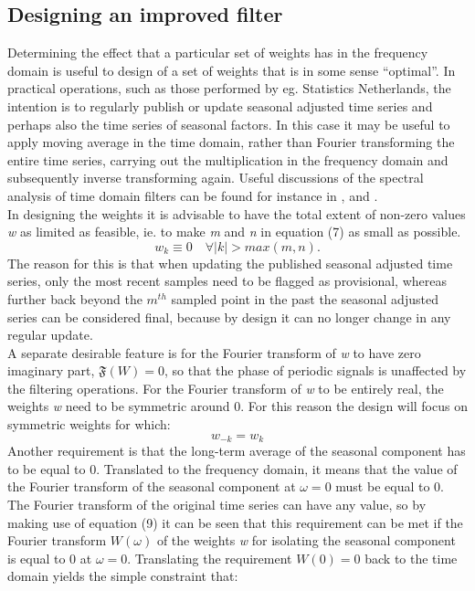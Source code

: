 \documentclass[english,blauw]{cbsdiscussionpaper}
\begin{document}
\subsection{ Designing an improved filter}
Determining the effect that a particular set of weights has in the frequency domain is useful to design of a set of weights that is in some sense ``optimal''. In practical operations, such as those performed by eg. Statistics Netherlands, the intention is to regularly publish or update seasonal adjusted time series and perhaps also the time series of seasonal factors. In this case it may be useful to apply moving average in the time domain, rather than Fourier transforming the entire time series, carrying out the multiplication in the frequency domain and subsequently inverse transforming again. Useful discussions of the spectral analysis of time domain filters can be found for instance in \citep{gre1970},\citep{shueal2011} and \citep{fineal2006}.\\In designing the weights it is advisable  to have the total extent of non-zero values \textit{w} as limited as feasible, ie. to make \textit{m} and \textit{n} in equation (7) as small as possible.
\begin{equation}
w_k \equiv 0 \quad \forall |k| > max(m,n).
\end{equation}
The reason for this is that when updating the published seasonal adjusted time series, only the most recent samples need to be flagged as provisional, whereas further back beyond the $m^{th}$ sampled point in the past the seasonal adjusted series can be considered final, because by design it can no longer change in any regular update.\\A separate desirable feature is for the Fourier transform of \textit{w} to have zero imaginary part, $\mathfrak{F}(W) = 0$, so that the phase of periodic signals is unaffected by the filtering operations. For the Fourier transform of \textit{w} to be entirely real, the weights \textit{w} need to be symmetric around 0. For this reason the design will focus on symmetric weights for which:
\begin{equation}
w_{-k} = w_k
\end{equation}
Another requirement is that the long-term average of the seasonal component has to be equal to 0. Translated to the frequency domain, it means that the value of the Fourier transform of the seasonal component at $\omega=0$ must be equal to 0. The Fourier transform of the original time series can have any value, so by making use of equation (9) it can be seen that this requirement can be met if the Fourier transform $W(\omega)$ of the weights \textit{w} for isolating the seasonal component is equal to 0 at $\omega=0$.  Translating the requirement $W(0)=0$ back to the time domain yields the simple constraint that:
\end{document}
